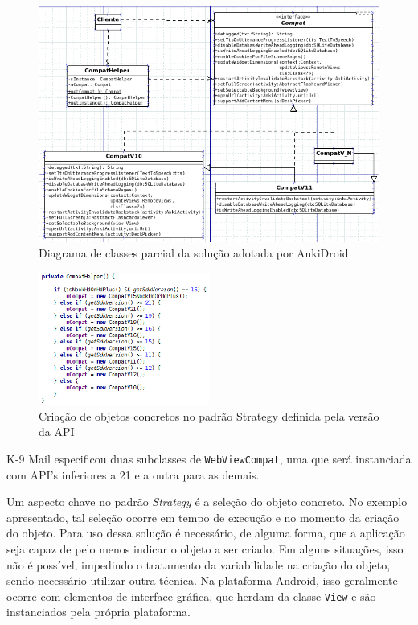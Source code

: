 \begin{figure}[ht]
\centering
\includegraphics[width=1\textwidth]{imagens/strategy_uml.png}
\caption{Diagrama de classes parcial da solução adotada por AnkiDroid}
\label{fig:strategy_uml}
\end{figure}

\begin{figure}[ht]
\centering
\includegraphics[width=0.5\textwidth]{imagens/strategy.png}
\caption{Criação de objetos concretos no padrão Strategy definida pela versão da API}
\label{fig:strategy}
\end{figure}

K-9 Mail especificou duas subclasses de \texttt{WebViewCompat}, uma que será instanciada com API’s inferiores a 21 e a outra para as demais.

Um aspecto chave no padrão \textit{Strategy} é a seleção do objeto concreto.
No exemplo apresentado, tal seleção ocorre em tempo de execução e no momento da
criação do objeto. Para uso dessa solução é necessário, de alguma forma, que a
aplicação seja capaz de pelo menos indicar o objeto a ser criado. Em alguns situações,
isso não é possível, impedindo o  tratamento da variabilidade na criação do objeto,
sendo necessário utilizar outra técnica. Na plataforma Android, isso geralmente
ocorre com elementos de interface gráfica, que herdam da classe \texttt{View} e
são instanciados pela própria plataforma.

